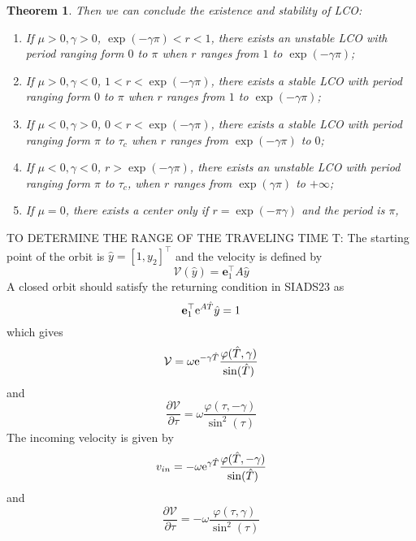 \documentclass{article}
\newtheorem{theorem}{Theorem}[section]
\begin{document}
%
\begin{theorem}
	Then we can conclude the existence and stability of LCO:
	\begin{enumerate}
		\item If $\mu >0, \gamma>0$, $\exp(-\gamma \pi)< r < 1$, there exists an unstable LCO with period ranging form $0$ to $\pi$ when $r$ ranges from $1$ to $\exp(-\gamma \pi)$;
		
		\item If $\mu >0, \gamma< 0$, $1< r < \exp(-\gamma \pi)$, there exists a stable LCO with period ranging form $0$ to $\pi$ when $r$ ranges from $1$ to $\exp(-\gamma \pi)$;
		
		
		\item If $\mu <0, \gamma>0$, $0< r < \exp(-\gamma \pi)$, there exists a stable LCO with period ranging form $\pi$ to $\tau_c$ when $r$ ranges from  $\exp(-\gamma \pi)$ to $0$;
		
		\item If $\mu <0, \gamma<0$, $r > \exp(-\gamma \pi)$, there exists an unstable LCO with period ranging form $\pi$ to $\tau_c$, when $r$ ranges from  $\exp(\gamma \pi)$ to $+ \infty$;
		
		\item If $\mu = 0$, there exists a center only if $r = \exp(-\pi \gamma)$ and the period is $\pi$,
		
	\end{enumerate}
\end{theorem}

TO DETERMINE THE RANGE OF THE TRAVELING TIME T:
The starting point of the orbit is 
$
\hat{y} = [1,y_2]^{\top}
$
and the velocity is defined by
\begin{equation}
\mathcal{V}(\hat{y}) = \mathbf{e}_1^{\top} A \hat{y}
\end{equation}
A closed orbit should satisfy the returning condition in SIADS23 as 
\[
\mathbf{e}_1^{\top} {\rm e}^{A \hat{T}} \hat{y} = 1
\]
which gives 
\[
 \mathcal{V} = \omega {\rm e}^{-\gamma \hat{T}} \frac{\varphi(\hat{T},\gamma) }{\sin(\hat{T})}
\]
and 
\begin{equation}
	\frac{\partial \mathcal{V}}{\partial \tau} = \omega \frac{\varphi(\tau,-\gamma)}{\sin^2(\tau)}
\end{equation}
The incoming velocity is given by
\[
v_{in} = -\omega {\rm e}^{\gamma \hat{T}} \frac{\varphi(\hat{T},-\gamma)}{\sin(\hat{T})}
\]
and 
\begin{equation}
	\frac{\partial \mathcal{V}}{\partial \tau} = -\omega \frac{\varphi(\tau,\gamma)}{\sin^2(\tau)}
\end{equation}
\end{document}
